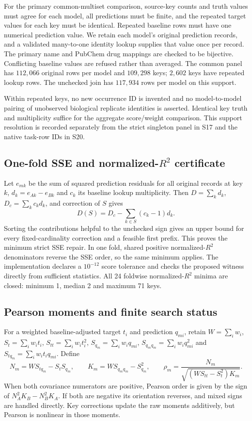 For the primary common-multiset comparison, source-key counts and truth values must agree for each model, all predictions must be finite, and the repeated target values for each key must be identical. Repeated baseline rows must have one numerical prediction value. We retain each model's original prediction records, and a validated many-to-one identity lookup supplies that value once per record. The primary name and PubChem drug mappings are checked to be bijective. Conflicting baseline values are refused rather than averaged. The common panel has $112{,}066$ original rows per model and $109{,}298$ keys; $2{,}602$ keys have repeated lookup rows. The unchecked join has $117{,}934$ rows per model on this support.

Within repeated keys, no new occurrence ID is invented and no model-to-model pairing of unobserved biological replicate identities is asserted. Identical key truth and multiplicity suffice for the aggregate score/weight comparison. This support resolution is recorded separately from the strict singleton panel in S17 and the native task-row IDs in S20.

\subsection{One-fold SSE and normalized-$R^2$ certificate}
Let $e_{mk}$ be the sum of squared prediction residuals for all original records at key $k$, $d_k=e_{Ak}-e_{Bk}$ and $c_k$ its baseline lookup multiplicity. Then $D=\sum_kd_k$, $D_c=\sum_kc_kd_k$, and correction of $S$ gives
\[
D(S)=D_c-\sum_{k\in S}(c_k-1)d_k.
\]
Sorting the contributions helpful to the unchecked sign gives an upper bound for every fixed-cardinality correction and a feasible first prefix. This proves the minimum strict SSE repair. In one fold, shared positive normalized-$R^2$ denominators reverse the SSE order, so the same minimum applies. The implementation declares a $10^{-12}$ score tolerance and checks the proposed witness directly from sufficient statistics. All 24 foldwise normalized-$R^2$ minima are closed: minimum 1, median 2 and maximum 71 keys.

\subsection{Pearson moments and finite search status}
For a weighted baseline-adjusted target $t_i$ and prediction $q_{mi}$, retain $W=\sum_iw_i$, $S_t=\sum_iw_it_i$, $S_{tt}=\sum_iw_it_i^2$, $S_{q_m}=\sum_iw_iq_{mi}$, $S_{q_mq_m}=\sum_iw_iq_{mi}^2$ and $S_{tq_m}=\sum_iw_it_iq_{mi}$. Define
\[
N_m=WS_{tq_m}-S_tS_{q_m},\qquad K_m=WS_{q_mq_m}-S_{q_m}^2,\qquad
\rho_m=\frac{N_m}{\sqrt{(WS_{tt}-S_t^2)K_m}}.
\]
When both covariance numerators are positive, Pearson order is given by the sign of $N_A^2K_B-N_B^2K_A$. If both are negative its orientation reverses, and mixed signs are handled directly. Key corrections update the raw moments additively, but Pearson is nonlinear in those moments.

